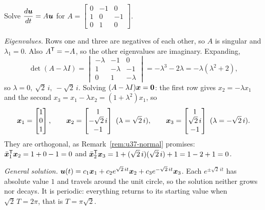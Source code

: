 \begin{example}[A skew-symmetric system $d\vb{u}/dt=A\vb{u}$]\label{ex:u37-skew}
Solve $\dfrac{d\boldsymbol{u}}{dt}=A\boldsymbol{u}$ for $A=\begin{bmatrix}0&-1&0\\1&0&-1\\0&1&0\end{bmatrix}$.

\emph{Eigenvalues.} Rows one and three are negatives of each other, so $A$ is singular and $\lambda_1=0$. Also $A^{\mathsf{T}}=-A$, so the other eigenvalues are imaginary. Expanding,
\[
\det(A-\lambda I)=\begin{vmatrix}-\lambda&-1&0\\1&-\lambda&-1\\0&1&-\lambda\end{vmatrix}=-\lambda^{3}-2\lambda=-\lambda(\lambda^{2}+2),
\]
so $\lambda=0,\ \sqrt2\,i,\ -\sqrt2\,i$. Solving $(A-\lambda I)\boldsymbol{x}=\boldsymbol{0}$: the first row gives $x_2=-\lambda x_1$ and the second $x_3=x_1-\lambda x_2=(1+\lambda^{2})x_1$, so
\[
\vb{x}_1=\begin{bmatrix}1\\0\\1\end{bmatrix},\qquad \vb{x}_2=\begin{bmatrix}1\\-\sqrt2\,i\\-1\end{bmatrix}\ (\lambda=\sqrt2\,i),\qquad \vb{x}_3=\begin{bmatrix}1\\\sqrt2\,i\\-1\end{bmatrix}\ (\lambda=-\sqrt2\,i).
\]
They are orthogonal, as Remark~\ref{rem:u37-normal} promises: $\bar{\boldsymbol{x}}_1^{\mathsf{T}}\boldsymbol{x}_2=1+0-1=0$ and $\bar{\boldsymbol{x}}_2^{\mathsf{T}}\boldsymbol{x}_3=1+(\sqrt2\,i)(\sqrt2\,i)+1=1-2+1=0$.

\emph{General solution.} $\boldsymbol{u}(t)=c_1\boldsymbol{x}_1+c_2e^{\sqrt2\,it}\boldsymbol{x}_2+c_3e^{-\sqrt2\,it}\boldsymbol{x}_3$. Each $e^{\pm\sqrt2\,it}$ has absolute value $1$ and travels around the unit circle, so the solution neither grows nor decays. It is periodic: everything returns to its starting value when $\sqrt2\,T=2\pi$, that is $T=\pi\sqrt2$.


\end{example}
